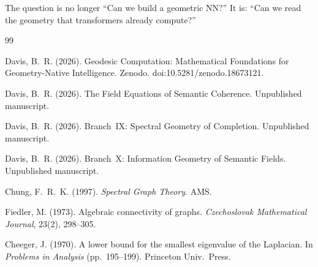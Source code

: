 \documentclass[11pt]{article}
\theoremstyle{remark}
\begin{document}
The question is no longer ``Can we build a geometric NN?'' 
It is: ``Can we read the geometry that transformers already 
compute?''


\begin{thebibliography}{99}

Davis, B.~R. (2026). Geodesic Computation: Mathematical 
Foundations for Geometry-Native Intelligence. Zenodo. 
doi:10.5281/zenodo.18673121.

Davis, B.~R. (2026). The Field Equations of Semantic 
Coherence. Unpublished manuscript.

Davis, B.~R. (2026). Branch~IX: Spectral Geometry of 
Completion. Unpublished manuscript.

Davis, B.~R. (2026). Branch~X: Information Geometry of 
Semantic Fields. Unpublished manuscript.

Chung, F.~R.~K. (1997). \emph{Spectral Graph Theory}. 
AMS.

Fiedler, M. (1973). Algebraic connectivity of graphs. 
\emph{Czechoslovak Mathematical Journal}, 23(2), 298--305.

Cheeger, J. (1970). A lower bound for the smallest 
eigenvalue of the Laplacian. In \emph{Problems in 
Analysis} (pp.~195--199). Princeton Univ.\ Press.

\end{thebibliography}
\end{document}
